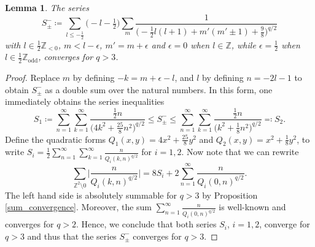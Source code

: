 \documentclass{amsart}
\newtheorem{lemma}[theorem]{Lemma}
\theoremstyle{definition}
\theoremstyle{remark}
\numberwithin{equation}{section}
\begin{document}
\begin{lemma}\label{series_1}
    The series
    \begin{equation*}
        S^-_\pm\coloneq\sum_{l\leq-\tfrac{1}{2}}\Big(-l-\tfrac{1}{2}\Big)\sum_m \frac{1}{\Big(-\tfrac{1}{2}l(l+1)+m'(m'\pm 1)+\tfrac{9}{8}\Big)^{q/2}}
    \end{equation*}
    with $l\in\tfrac{1}{2}\mathbb{Z}_{<0}$, $m<l-\epsilon$, $m'=m+\epsilon$ and $\epsilon=0$ when $l\in\mathbb{Z}$, while $\epsilon=\tfrac{1}{2}$ when $l\in\tfrac{1}{2}\mathbb{Z}_\mathrm{odd}$, converges for $q>3$. 
\end{lemma}
\begin{proof}
   Replace $m$ by defining $-k=m+\epsilon-l$, and $l$ by defining $n=-2l-1$ to obtain $S_{\pm}^-$ as a double sum over the natural numbers. In this form, one immediately obtains the series inequalities 
    \begin{equation*}
        S_1\coloneq \sum_{n=1}^\infty \sum_{k=1}^\infty\frac{\tfrac{1}{2}n}{\Big(4k^2+\tfrac{25}{8}n^2\Big)^{q/2}} \leq S^-_\pm\leq \sum_{n=1}^\infty \sum_{k=1}^\infty\frac{\tfrac{1}{2}n}{\Big(k^2+\tfrac{1}{8}n^2\Big)^{q/2}}\eqcolon S_2.
    \end{equation*}
   Define the quadratic forms $Q_1(x,y)=4x^2+\tfrac{25}{8}y^2$ and $Q_2(x,y)=x^2+\tfrac{1}{8}y^2$, to write $S_i=\tfrac{1}{2}\sum_{n=1}^\infty\sum_{k=1}^\infty\frac{n}{Q_i(k,n)^{q/2}}$ for $i=1,2$. Now note that we can rewrite
    \begin{equation*}
        \sum_{\mathbb{Z}^2\setminus 0}\bigg|\frac{n}{Q_i(k,n)^{q/2}}\bigg|=8S_i+2\sum_{n=1}^\infty\frac{n}{Q_i(0,n)^{q/2}}.
    \end{equation*}
   The left hand side is absolutely summable for $q>3$ by Proposition \ref{sum_convergence}. Moreover, the sum $\sum_{n=1}^\infty \frac{n}{Q_i(0,n)^{q/2}}$ is well-known and converges for $q>2$. Hence, we conclude that both series $S_i$, $i=1,2$, converge for $q>3$ and thus that the series $S^-_\pm$ converges for $q>3$.   
\end{proof}
\end{document}
